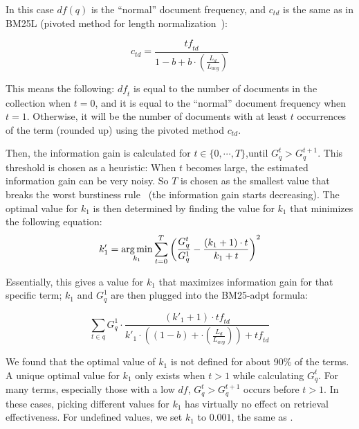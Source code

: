 In this case $\mathit{df}(q)$ is the ``normal'' document frequency, and $c_{\mathit{td}}$ is the same as in BM25L (pivoted method for length normalization~\cite{ctd}):

\begin{equation}
	c_{\mathit{td}} = \frac{\mathit{tf}_{\mathit{td}}}{1-b+b\cdot\left(\frac{L_d}{L_{\mathit{avg}}}\right)}
\end{equation}

This means the following: $\mathit{df}_t$ is equal to the number of documents in the collection when $t = 0$, and it is equal to the ``normal'' document frequency when $t = 1$. Otherwise, it will be the number of documents with at least $t$ occurrences of the term (rounded up) using the pivoted method $c_{\mathit{td}}$. 

Then, the information gain is calculated for $t \in \{0,\cdots,T\}$,until $G^t_q > G^{t+1}_q$. This threshold is chosen as a heuristic: When $t$ becomes large, the estimated information gain can be very noisy. So $T$ is chosen as the smallest value that breaks the worst burstiness rule~\citep{burstiness_rule} (the information gain starts decreasing). The optimal value for $k_1$ is then determined by finding the value for $k_1$ that minimizes the following equation:
\begin{equation}
	k'_1 = \operatorname*{arg\,min}_{k_1} \sum_{t=0}^{T}\left(\frac{G^t_q}{G^1_q} - \frac{(k_1+1)\cdot t}{k_1+t}\right)^2
\end{equation}

Essentially, this gives a value for $k_1$ that maximizes information gain for that specific term; $k_1$ and $G^1_q$ are then plugged into the BM25-adpt formula: 

\begin{equation}
	\label{bm25-adpt}
	\sum_{t\in q}G_q^1\cdot\frac{\left(k'_1+1\right)\cdot \mathit{tf}_{\mathit{td}}}{k'_1\cdot\left(\left(1-b\right)+\cdot\left(\frac{L_d}{L_{\mathit{avg}}}\right)\right)+\mathit{tf}_{\mathit{td}}}
\end{equation}

We found that the optimal value of $k_1$ is not defined for about 90\% of the terms. A unique optimal value for $k_1$ only exists when $t > 1$ while calculating $G^t_q$. For many terms, especially those with a low $\mathit{df}$, $G^t_q > G^{t+1}_q$ occurs before $t > 1$. In these cases, picking different values for $k_1$ has virtually no effect on retrieval effectiveness. For undefined values, we set $k_1$ to $0.001$, the same as \citet{trotman-bm25}.

